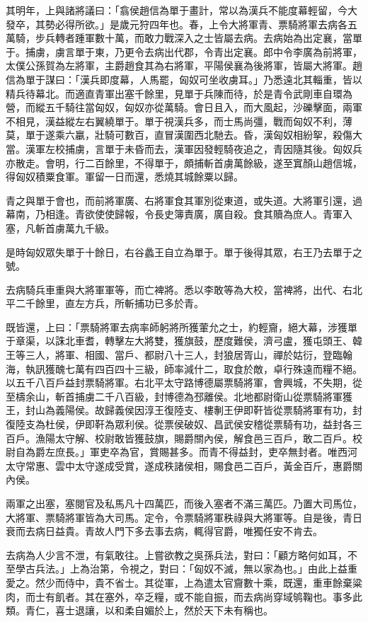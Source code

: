 \begin{pinyinscope}
其明年，上與諸將議曰：「翕侯趙信為單于畫計，常以為漢兵不能度幕輕留，今大發卒，其勢必得所欲。」是歲元狩四年也。春，上令大將軍青、票騎將軍去病各五萬騎，步兵轉者踵軍數十萬，而敢力戰深入之士皆屬去病。去病始為出定襄，當單于。捕虜，虜言單于東，乃更令去病出代郡，令青出定襄。郎中令李廣為前將軍，太僕公孫賀為左將軍，主爵趙食其為右將軍，平陽侯襄為後將軍，皆屬大將軍。趙信為單于謀曰：「漢兵即度幕，人馬罷，匈奴可坐收虜耳。」乃悉遠北其輜重，皆以精兵待幕北。而適直青軍出塞千餘里，見單于兵陳而待，於是青令武剛車自環為營，而縱五千騎往當匈奴，匈奴亦從萬騎。會日且入，而大風起，沙礫擊面，兩軍不相見，漢益縱左右翼繞單于。單于視漢兵多，而士馬尚彊，戰而匈奴不利，薄莫，單于遂乘六臝，壯騎可數百，直冒漢圍西北馳去。昏，漢匈奴相紛挐，殺傷大當。漢軍左校捕虜，言單于未昏而去，漢軍因發輕騎夜追之，青因隨其後。匈奴兵亦散走。會明，行二百餘里，不得單于，頗捕斬首虜萬餘級，遂至窴顏山趙信城，得匈奴積粟食軍。軍留一日而還，悉燒其城餘粟以歸。

青之與單于會也，而前將軍廣、右將軍食其軍別從東道，或失道。大將軍引還，過幕南，乃相逢。青欲使使歸報，令長史簿責廣，廣自殺。食其贖為庶人。青軍入塞，凡斬首虜萬九千級。

是時匈奴眾失單于十餘日，右谷蠡王自立為單于。單于後得其眾，右王乃去單于之號。

去病騎兵車重與大將軍軍等，而亡裨將。悉以李敢等為大校，當裨將，出代、右北平二千餘里，直左方兵，所斬捕功已多於青。

既皆還，上曰：「票騎將軍去病率師躬將所獲葷允之士，約輕齎，絕大幕，涉獲單于章渠，以誅北車耆，轉擊左大將雙，獲旗鼓，歷度難侯，濟弓盧，獲屯頭王、韓王等三人，將軍、相國、當戶、都尉八十三人，封狼居胥山，禪於姑衍，登臨翰海，執訊獲醜七萬有四百四十三級，師率減什二，取食於敵，卓行殊遠而糧不絕。以五千八百戶益封票騎將軍。右北平太守路博德屬票騎將軍，會興城，不失期，從至檮余山，斬首捕虜二千八百級，封博德為邳離侯。北地都尉衛山從票騎將軍獲王，封山為義陽侯。故歸義侯因淳王復陸支、樓剸王伊即靬皆從票騎將軍有功，封復陸支為杜侯，伊即靬為眾利侯。從票侯破奴、昌武侯安稽從票騎有功，益封各三百戶。漁陽太守解、校尉敢皆獲鼓旗，賜爵關內侯，解食邑三百戶，敢二百戶。校尉自為爵左庶長。」軍吏卒為官，賞賜甚多。而青不得益封，吏卒無封者。唯西河太守常惠、雲中太守遂成受賞，遂成秩諸侯相，賜食邑二百戶，黃金百斤，惠爵關內侯。

兩軍之出塞，塞閱官及私馬凡十四萬匹，而後入塞者不滿三萬匹。乃置大司馬位，大將軍、票騎將軍皆為大司馬。定令，令票騎將軍秩祿與大將軍等。自是後，青日衰而去病日益貴。青故人門下多去事去病，輒得官爵，唯獨任安不肯去。

去病為人少言不泄，有氣敢往。上嘗欲教之吳孫兵法，對曰：「顧方略何如耳，不至學古兵法。」上為治第，令視之，對曰：「匈奴不滅，無以家為也。」由此上益重愛之。然少而侍中，貴不省士。其從軍，上為遣太官齎數十乘，既還，重車餘棄粱肉，而士有飢者。其在塞外，卒乏糧，或不能自振，而去病尚穿域鸲鞠也。事多此類。青仁，喜士退讓，以和柔自媚於上，然於天下未有稱也。


\end{pinyinscope}
